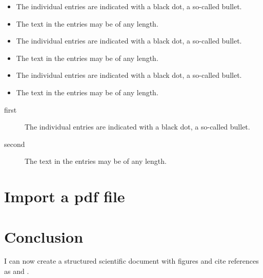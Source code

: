 \documentclass[11pt,a4paper]{article}
\begin{document}
\begin{itemize}[label=$\star$]
  \item The individual entries are indicated with a black dot, a so-called bullet.
  \item The text in the entries may be of any length.
\end{itemize}

\begin{itemize}[label=$\ast$]
  \item The individual entries are indicated with a black dot, a so-called bullet.
  \item The text in the entries may be of any length.
\end{itemize}

\begin{itemize}[label=$\rightarrow$]
  \item The individual entries are indicated with a black dot, a so-called bullet.
  \item The text in the entries may be of any length.
\end{itemize}

\begin{description}
  \item[first] The individual entries are indicated with a black dot, a so-called bullet.
  \item[second] The text in the entries may be of any length.
\end{description}



\section{Import a pdf file}




\section{Conclusion}

I can now create a structured scientific document
with figures and cite references as \cite{plmlatex_better_than_word} and \parencite{plmlatex_better_than_word}.

\newpage
\thispagestyle{empty}
\mbox{}
\newpage


\printbibliography[
    heading=bibintoc, %
    title={Bibliography} %
]
\end{document}
